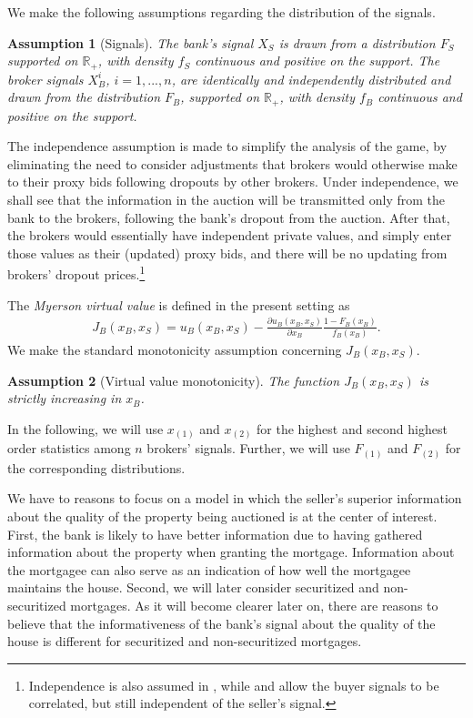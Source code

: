 \documentclass[11pt,twopage]{article}
\newtheorem{assumption}{Assumption}
{\bf}{\it}
\begin{document}
We make the following assumptions regarding the distribution of the
signals.
\begin{assumption}[Signals]\label{as:info}
  The bank's signal $X_S$ is drawn from a distribution $F_S$ supported
  on $\mathbb R_{+}$, with density $f_S$ continuous and positive on
  the support. The broker signals $X_B^i$, $i=1,...,n$, are
  identically and independently distributed and drawn from the
  distribution $F_B$, supported on $\mathbb R_{+}$, with density $f_B$
  continuous and positive on the support.  \medskip
\end{assumption}
The independence assumption is made to simplify the analysis of the
game, by eliminating the need to consider adjustments that brokers
would otherwise make to their proxy bids following dropouts by other
brokers. Under independence, we shall see that the information in the
auction will be transmitted only from the bank to the brokers,
following the bank's dropout from the auction. After that, the brokers
would essentially have independent private values, and simply enter
those values as their (updated) proxy bids, and there will be no
updating from brokers' dropout prices.\footnote{Independence is also
  assumed in \cite{jullien2006auction}, while \cite{cai2007reserve}
  and \cite{lamy} allow the buyer signals to be correlated, but still
  independent of the seller's signal.}

The \emph{Myerson virtual value} is defined in the present setting as
\begin{align} J_B(x_B,x_S) = u_B(x_B,x_S) -\frac{\partial
    u_B(x_B,x_S)}{\partial x_B} \frac{1-F_B(x_B)}{f_B(x_B)}.
\end{align}
We make the standard monotonicity assumption concerning
$J_B(x_B,x_S)$.
\begin{assumption}[Virtual value monotonicity] \label{as:myerson} The
  function $J_B(x_B,x_S)$ is strictly increasing in $x_B$.
\end{assumption}

In the following, we will use $x_{(1)}$ and $x_{(2)}$ for the highest
and second highest order statistics among $n$ brokers'
signals. Further, we will use $F_{(1)}$ and $F_{(2)}$ for the
corresponding distributions.

We have to reasons to focus on a model in which the seller's superior
information about the quality of the property being auctioned is at
the center of interest. First, the bank is likely to have better
information due to having gathered information about the property when
granting the mortgage. Information about the mortgagee can also serve
as an indication of how well the mortgagee maintains the
house. Second, we will later consider securitized and non-securitized
mortgages. As it will become clearer later on, there are reasons to
believe that the informativeness of the bank's signal about the
quality of the house is different for securitized and non-securitized
mortgages.
\end{document}
